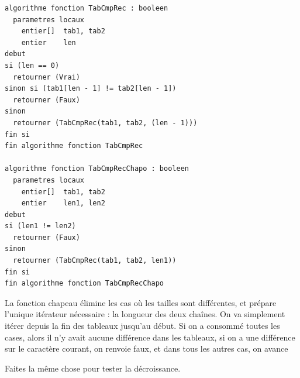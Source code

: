 \documentclass[11pt,a4paper]{article}
\begin{document}
\vfillLast

\clearpage

\vfillFirst


\begin{table}[ht!]
  \centering
\begin{lstlisting}[style=algorithmique]
algorithme fonction TabCmpRec : booleen
  parametres locaux
    entier[]  tab1, tab2
    entier    len
debut
si (len == 0)
  retourner (Vrai)
sinon si (tab1[len - 1] != tab2[len - 1])
  retourner (Faux)
sinon
  retourner (TabCmpRec(tab1, tab2, (len - 1)))
fin si
fin algorithme fonction TabCmpRec

algorithme fonction TabCmpRecChapo : booleen
  parametres locaux
    entier[]  tab1, tab2
    entier    len1, len2
debut
si (len1 != len2)
  retourner (Faux)
sinon
  retourner (TabCmpRec(tab1, tab2, len1))
fin si
fin algorithme fonction TabCmpRecChapo \end{lstlisting}
  \caption{La fonction chapeau élimine les cas où les tailles sont différentes, et prépare l'unique itérateur nécessaire : la longueur des deux chaînes. On va simplement itérer depuis la fin des tableaux jusqu'au début. Si on a consommé toutes les cases, alors il n'y avait aucune différence dans les tableaux, si on a une différence sur le caractère courant, on renvoie faux, et dans tous les autres cas, on avance}
\end{table}


\vfillLast


\newpage


Faites la même chose pour tester la décroissance.
\end{document}
